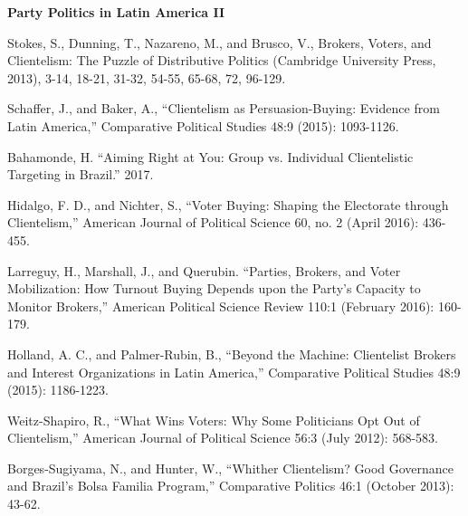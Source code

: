 \documentclass[letterpaper]{article}
\renewenvironment{itemize}{
  \begin{list}{}{
    \setlength{\leftmargin}{1.5em}
  }
}{
  \end{list}
}
\begin{document}
\begin{enumerate}
\item {\bf Party Politics in Latin America II}
	\begin{itemize}
		\item[$\bullet$] Stokes, S., Dunning, T., Nazareno, M., and Brusco, V., Brokers, Voters, and Clientelism: The Puzzle of Distributive Politics (Cambridge University Press, 2013), 3-14, 18-21, 31-32, 54-55, 65-68, 72, 96-129.
		\item[$\bullet$] Schaffer, J., and Baker, A., ``Clientelism as Persuasion-Buying: Evidence from Latin America,'' Comparative Political Studies 48:9 (2015): 1093-1126.
		\item[$\bullet$] Bahamonde, H. ``Aiming Right at You: Group vs. Individual Clientelistic Targeting in Brazil.'' 2017.
		\item[$\bullet$] Hidalgo, F. D., and Nichter, S., ``Voter Buying: Shaping the Electorate through Clientelism,'' American Journal of Political Science 60, no. 2 (April 2016): 436-455.
		\item[$\bullet$] Larreguy, H., Marshall, J., and Querubin. ``Parties, Brokers, and Voter Mobilization: How Turnout Buying Depends upon the Party's Capacity to Monitor Brokers,'' American Political Science Review 110:1 (February 2016): 160-179.
		\item[$\bullet$] Holland, A. C., and Palmer-Rubin, B., ``Beyond the Machine: Clientelist Brokers and Interest Organizations in Latin America,'' Comparative Political Studies 48:9 (2015): 1186-1223.
		\item[$\bullet$] Weitz-Shapiro, R., ``What Wins Voters: Why Some Politicians Opt Out of Clientelism,'' American Journal of Political Science 56:3 (July 2012): 568-583.
		\item[$\bullet$] Borges-Sugiyama, N., and Hunter, W., ``Whither Clientelism? Good Governance and Brazil's Bolsa Familia Program,'' Comparative Politics 46:1 (October 2013): 43-62.		
	\end{itemize}
\end{enumerate}


 









%
%
\end{document}
